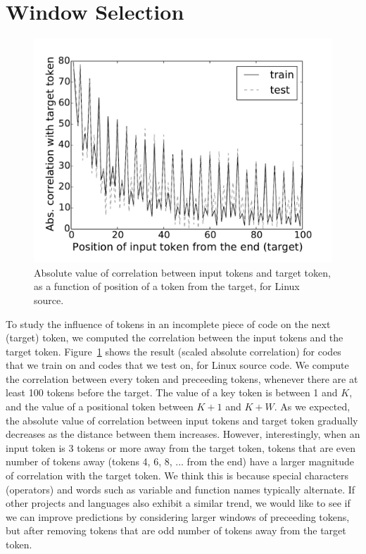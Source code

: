 \section{Window Selection}
\label{sec:window}

\begin{figure}[h]
  \centering
  \includegraphics[width=\linewidth]{figs/correlation.pdf}
  \caption{Absolute value of correlation between input tokens and target token,
    as a function of position of a token from the target, for Linux source.}
  \label{fig:correlation}
\end{figure}

\noindent
To study the influence of tokens in an incomplete piece of code on the next
(target) token, we computed the correlation between the input tokens and the
target token.
Figure~\ref{fig:correlation} shows the result (scaled absolute correlation) for
codes that we train on and codes that we test on, for Linux
source code.
We compute the correlation between every token and preceeding tokens, whenever
there are at least 100 tokens before the target.
The value of a key token is between 1 and $K$, and the value of a positional
token between $K+1$ and $K+W$.
As we expected, the absolute value of correlation between input tokens and
target token gradually decreases as the distance between them increases.
However, interestingly, when an input token is 3 tokens or more away from the
target token, tokens that are even number of tokens away (tokens 4, 6, 8, ...
from the end) have a larger magnitude of correlation with the target token.
We think this is because special characters (operators) and words such as variable and
function names typically alternate. If other projects and languages
also exhibit a similar trend, we would like to see if we can improve
predictions by considering larger windows of preceeding tokens, but after
removing tokens that are odd number of tokens away from the target token.
